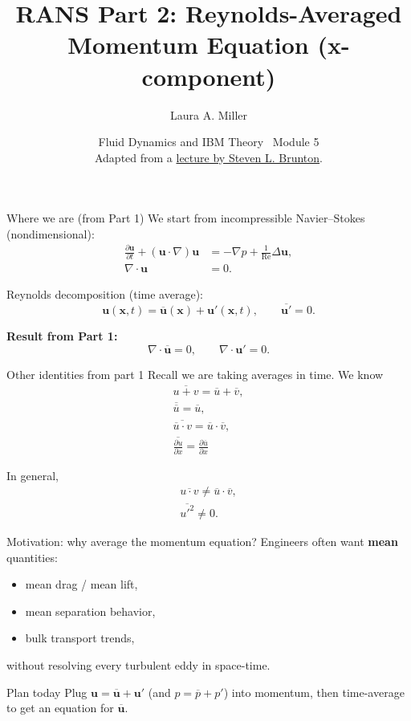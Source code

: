 \documentclass[aspectratio=169,11pt]{beamer}
\title[RANS II: Momentum]{RANS Part 2: Reynolds-Averaged Momentum Equation (x-component)}
\author[Miller]{Laura A. Miller}
\institute[UArizona]{Department of Mathematics, University of Arizona}
\date{Fluid Dynamics and IBM Theory \textbullet\ Module 5\\[3pt]
  Adapted from a \href{https://www.youtube.com/watch?v=mDt-HJEXK6g}{lecture by Steven L. Brunton}.}
\newcommand{\x}{\bm{x}}
\newcommand{\uu}{\bm{u}}
\newcommand{\pp}{p}
\newcommand{\Rey}{\mathrm{Re}}
\newcommand{\avg}[1]{\overline{#1}}
\renewcommand{\up}{\uu'} %
\newcommand{\ubar}{\avg{\uu}}
\newcommand{\grad}{\nabla}
\newcommand{\Div}{\nabla\cdot}
\newcommand{\Lap}{\Delta}
\begin{document}
\begin{frame}[plain]
\maketutorialtitle
\end{frame}

\begin{frame}{Where we are (from Part 1)}
We start from incompressible Navier--Stokes (nondimensional):
\begin{align*}
\frac{\partial \uu}{\partial t}  + (\uu\cdot\grad)\uu &= -\grad \pp + \frac{1}{\Rey}\Lap\uu,\\
\Div\uu &= 0.
\end{align*}

Reynolds decomposition (time average):
\[
\uu(\x,t)=\ubar(\x)+\up(\x,t),\qquad \avg{\up}=0.
\]

\textbf{Result from Part 1:}
\[
\Div\ubar=0,\qquad \Div\up=0.
\]
\end{frame}

\begin{frame}{Other identities from part 1}
Recall we are taking averages in time. We know \\
\begin{align*}
\avg{u+v}=\avg{u}+\avg{v},\\
\avg{\avg{u}}=\avg{u},\\
\avg{\avg{u}\cdot v}=\avg{u}\cdot \avg{v},\\
\avg{\frac{\partial u}{\partial x}}=\frac{\partial \avg{u}}{\partial x}
\end{align*}

In general, 
\begin{align*}
\avg{u\cdot v}\neq \avg{u}\cdot \avg{v},\\
\avg{u'^2}\neq 0.
\end{align*}
\end{frame}
\begin{frame}{Motivation: why average the momentum equation?}
Engineers often want \textbf{mean} quantities:
\begin{itemize}
  \item mean drag / mean lift,
  \item mean separation behavior,
  \item bulk transport trends,
\end{itemize}
without resolving every turbulent eddy in space-time.

\begin{block}{Plan today}
Plug $\uu=\ubar+\up$ (and $\pp=\avg{\pp}+\pp'$) into momentum,
then time-average to get an equation for $\ubar$.
\end{block}
\end{frame}
\end{document}
